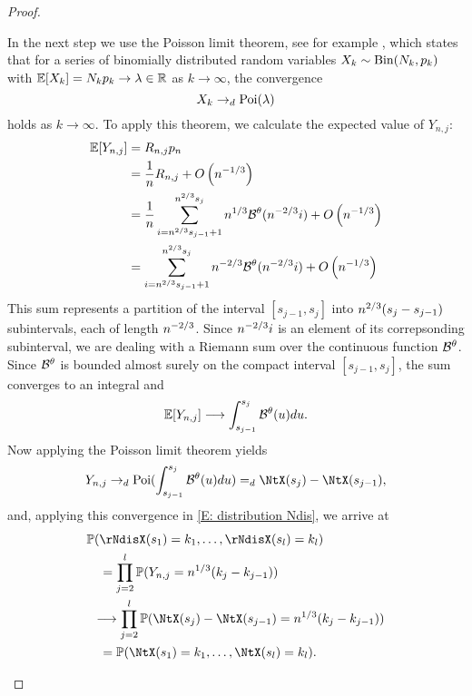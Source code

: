 \begin{proof}
\begin{proofpart}
In the next step we use the Poisson limit theorem, see for example \cite[Theorem 3.7, p.79]{Klenke.2006},
which states that for a series of binomially distributed random variables $X_k \sim \operatorname*{Bin}(N_k, p_k)$
with $\mathbb{E}[X_k] = N_k p_k \rightarrow \lambda \in \mathbb{R}$ as $k \rightarrow \infty$,
the convergence 
\begin{equation}
	X_k \rightarrow_d \operatorname*{Poi}(\lambda)
\end{equation}
holds as $k \rightarrow \infty$.
To apply this theorem, we calculate the expected value of $Y_{n,j}$:
\begin{align*}
\mathbb{E}[Y_{n,j}] 
&= R_{n,j} p_n \\
&= \frac{1}{n} R_{n,j} + O\left(n^{-1 / 3}\right)\\
&= \frac{1}{n} \sum_{i=n^{2 / 3}s_{j-1}+1}^{n^{2 / 3}s_j}n^{1 / 3}\mathcal{B}^{\theta}(n^{-2 / 3}i) + O\left(n^{-1 / 3}\right)\\
&= \sum_{i=n^{2 / 3}s_{j-1}+1}^{n^{2 / 3}s_j}n^{-2 / 3}\mathcal{B}^{\theta}(n^{-2 / 3}i) + O\left(n^{-1 / 3}\right)
\end{align*}
This sum represents a partition of the interval $[s_{j-1}, s_j]$ into $n^{2 / 3}(s_j - s_{j-1})$ subintervals, each of length $n^{-2 / 3}$.
Since $n^{-2 / 3}i$ is an element of its correpsonding subinterval, 
we are dealing with a Riemann sum over the continuous function $\mathcal{B}^{\theta}$.
Since $\mathcal{B}^{\theta}$ is bounded almost surely on the compact interval $[s_{j-1}, s_j]$,
the sum converges to an integral and
\begin{equation}
\mathbb{E}[Y_{n,j}] \longrightarrow \int_{s_{j-1}}^{s_j} \mathcal{B}^{\theta}(u)du.
\end{equation}
Now applying the Poisson limit theorem yields
\begin{equation} \label{E: convergence dist Yj}
Y_{n,j} \rightarrow_d \Poisson( \int_{s_{j-1}}^{s_j} \BtX(u)du ) =_d \NtX(s_j) - \NtX(s_{j-1}),
\end{equation}
and, applying this convergence in \eqref{E: distribution Ndis}, we arrive at
\begin{equation*}
\begin{aligned}
&\Prob(\rNdisX(s_1) = k_1, \dots, \rNdisX(s_l) = k_l) \\
&\quad = \prod_{j=2}^{l} \Prob( Y_{n,j} = \n{1}{3}(k_j - k_{j-1}) ) \\
&\enspace \longrightarrow \prod_{j=2}^{l} \Prob( \NtX(s_j) - \NtX(s_{j-1}) = \n{1}{3}(k_j - k_{j-1}) ) \\
&\quad = \Prob(\NtX(s_1) = k_1, \dots, \NtX(s_l) = k_l).
\end{aligned}
\end{equation*}


\end{proofpart}
\end{proof}
